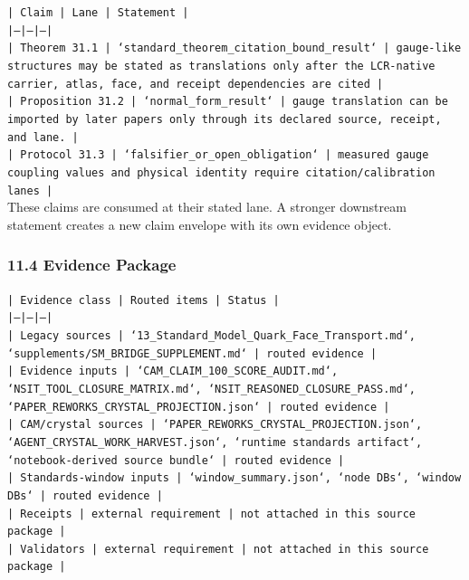 \documentclass[11pt]{article}
\begin{document}
\noindent\texttt{| Claim | Lane | Statement |}\\
\noindent\texttt{|---|---|---|}\\
\noindent\texttt{| Theorem 31.1 | `standard\_theorem\_citation\_bound\_result` | gauge-like structures may be stated as translations only after the LCR-native carrier, atlas, face, and receipt dependencies are cited |}\\
\noindent\texttt{| Proposition 31.2 | `normal\_form\_result` | gauge translation can be imported by later papers only through its declared source, receipt, and lane. |}\\
\noindent\texttt{| Protocol 31.3 | `falsifier\_or\_open\_obligation` | measured gauge coupling values and physical identity require citation/calibration lanes |}\\

These claims are consumed at their stated lane. A stronger downstream statement
creates a new claim envelope with its own evidence object.

\subsubsection*{11.4 Evidence Package}

\noindent\texttt{| Evidence class | Routed items | Status |}\\
\noindent\texttt{|---|---|---|}\\
\noindent\texttt{| Legacy sources | `13\_Standard\_Model\_Quark\_Face\_Transport.md`, `supplements/SM\_BRIDGE\_SUPPLEMENT.md` | routed evidence |}\\
\noindent\texttt{| Evidence inputs | `CAM\_CLAIM\_100\_SCORE\_AUDIT.md`, `NSIT\_TOOL\_CLOSURE\_MATRIX.md`, `NSIT\_REASONED\_CLOSURE\_PASS.md`, `PAPER\_REWORKS\_CRYSTAL\_PROJECTION.json` | routed evidence |}\\
\noindent\texttt{| CAM/crystal sources | `PAPER\_REWORKS\_CRYSTAL\_PROJECTION.json`, `AGENT\_CRYSTAL\_WORK\_HARVEST.json`, `runtime standards artifact`, `notebook-derived source bundle` | routed evidence |}\\
\noindent\texttt{| Standards-window inputs | `window\_summary.json`, `node DBs`, `window DBs` | routed evidence |}\\
\noindent\texttt{| Receipts | external requirement | not attached in this source package |}\\
\noindent\texttt{| Validators | external requirement | not attached in this source package |}\\
\end{document}

